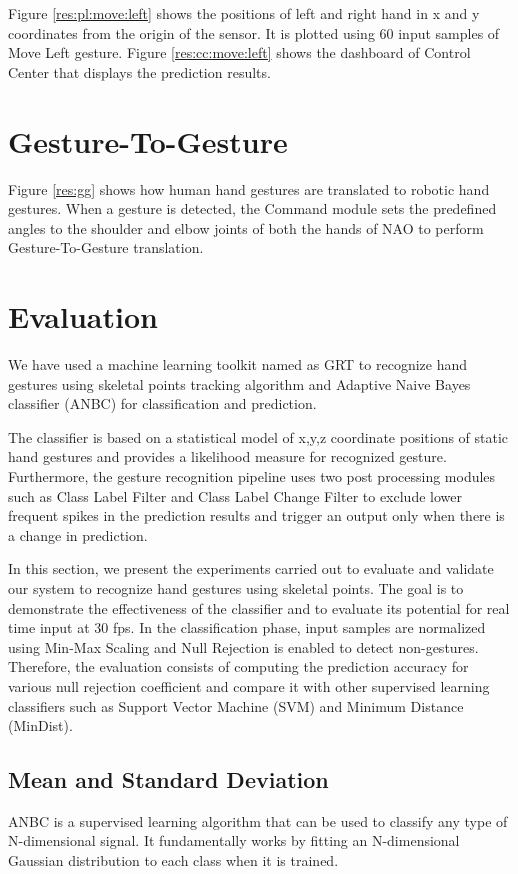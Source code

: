 

Figure \ref{res:pl:move:left} shows the positions of left and right hand in x and y coordinates from the origin of the sensor. It is plotted using 60 input samples of Move Left gesture. Figure \ref{res:cc:move:left} shows the dashboard of Control Center that displays the prediction results. 

\clearpage

\section{Gesture-To-Gesture} Figure \ref{res:gg} shows how human hand gestures are translated to robotic hand gestures. When a gesture is detected, the Command module sets the predefined angles to the shoulder and elbow joints of both the hands of NAO to perform Gesture-To-Gesture translation. 



\section{Evaluation} We have used a machine learning toolkit named as GRT to recognize hand gestures using skeletal points tracking algorithm and Adaptive Naive Bayes classifier (ANBC) for classification and prediction. 

The classifier is based on a statistical model of x,y,z coordinate positions of static hand gestures and provides a likelihood measure for recognized gesture. Furthermore, the gesture recognition pipeline uses two post processing modules such as Class Label Filter and Class Label Change Filter to exclude lower frequent spikes in the prediction results and trigger an output only when there is a change in prediction.

In this section, we present the experiments carried out to evaluate and validate our system to recognize hand gestures using skeletal points. The goal is to demonstrate the effectiveness of the classifier and to evaluate its potential for real time input at 30 fps. In the classification phase, input samples are normalized using Min-Max Scaling and Null Rejection is enabled to detect non-gestures. Therefore, the evaluation consists of computing the prediction accuracy for various null rejection coefficient and compare it with other supervised learning classifiers such as Support Vector Machine (SVM) and Minimum Distance (MinDist).

\subsection{Mean and Standard Deviation} ANBC is a supervised learning algorithm that can be used to classify any type of N-dimensional signal. It fundamentally works by fitting an N-dimensional Gaussian distribution to each class when it is trained.

